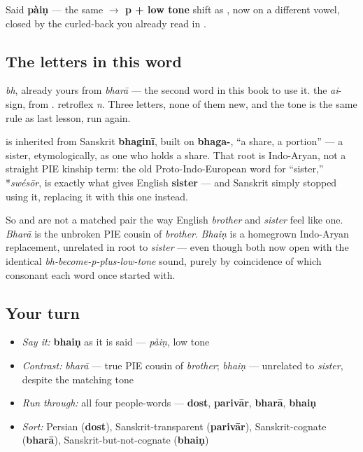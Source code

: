Said \textbf{pàiṇ} — the same \textbf{ $\to$ p + low tone} shift as \textbf{}, now on a different vowel, closed by the curled-back \textbf{} you already read in \textbf{}.

\subsection*{The letters in this word}
\textbf{} \emph{bh}, already yours from \emph{bharā} — the second word in this book to use it. \textbf{} the \emph{ai}-sign, from \textbf{}. \textbf{} retroflex \emph{n}. Three letters, none of them new, and the tone is the same rule as last lesson, run again.

\begin{cousinweb}
\textbf{} is inherited from Sanskrit \textbf{bhaginī}, built on \textbf{bhaga-}, \textquotedblleft{}a share, a portion\textquotedblright{} — a sister, etymologically, as one who holds a share. That root is Indo-Aryan, not a straight PIE kinship term: the old Proto-Indo-European word for \textquotedblleft{}sister,\textquotedblright{} *\emph{swésōr}, is exactly what gives English \textbf{sister} — and Sanskrit simply stopped using it, replacing it with this one instead.

So \textbf{} and \textbf{} are not a matched pair the way English \emph{brother} and \emph{sister} feel like one. \emph{Bharā} is the unbroken PIE cousin of \emph{brother}. \emph{Bhaiṇ} is a homegrown Indo-Aryan replacement, unrelated in root to \emph{sister} — even though both now open with the identical \emph{bh-become-p-plus-low-tone} sound, purely by coincidence of which consonant each word once started with.
\end{cousinweb}

\subsection*{Your turn}
\begin{itemize}
\raggedright
  \item \emph{Say it:} \textbf{bhaiṇ} as it is said — \emph{pàiṇ}, low tone
  \item \emph{Contrast:} \emph{bharā} — true PIE cousin of \emph{brother}; \emph{bhaiṇ} — unrelated to \emph{sister}, despite the matching tone
  \item \emph{Run through:} all four people-words — \textbf{dost}, \textbf{parivār}, \textbf{bharā}, \textbf{bhaiṇ}
  \item \emph{Sort:} Persian (\textbf{dost}), Sanskrit-transparent (\textbf{parivār}), Sanskrit-cognate (\textbf{bharā}), Sanskrit-but-not-cognate (\textbf{bhaiṇ})
\end{itemize}

